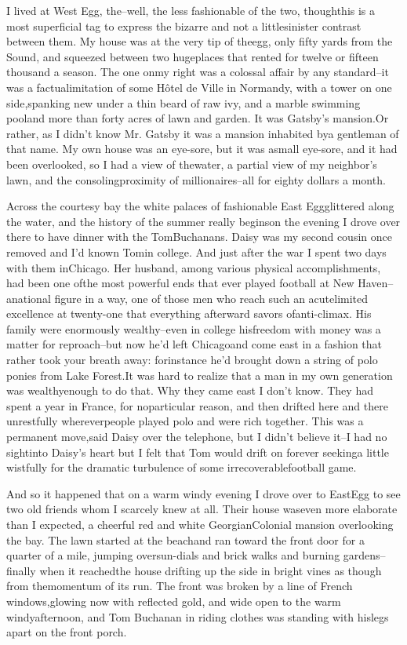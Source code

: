 \documentclass[12pt,a4paper]{report}
\begin{document}
I lived at West Egg, the--well, the less fashionable of the two, thoughthis is a most superficial tag to express the bizarre and not a littlesinister contrast between them. My house was at the very tip of theegg, only fifty yards from the Sound, and squeezed between two hugeplaces that rented for twelve or fifteen thousand a season. The one onmy right was a colossal affair by any standard--it was a factualimitation of some Hôtel de Ville in Normandy, with a tower on one side,spanking new under a thin beard of raw ivy, and a marble swimming pooland more than forty acres of lawn and garden. It was Gatsby's mansion.Or rather, as I didn't know Mr. Gatsby it was a mansion inhabited bya gentleman of that name. My own house was an eye-sore, but it was asmall eye-sore, and it had been overlooked, so I had a view of thewater, a partial view of my neighbor's lawn, and the consolingproximity of millionaires--all for eighty dollars a month.

Across the courtesy bay the white palaces of fashionable East Eggglittered along the water, and the history of the summer really beginson the evening I drove over there to have dinner with the TomBuchanans. Daisy was my second cousin once removed and I'd known Tomin college. And just after the war I spent two days with them inChicago.
Her husband, among various physical accomplishments, had been one ofthe most powerful ends that ever played football at New Haven--anational figure in a way, one of those men who reach such an acutelimited excellence at twenty-one that everything afterward savors ofanti-climax. His family were enormously wealthy--even in college hisfreedom with money was a matter for reproach--but now he'd left Chicagoand come east in a fashion that rather took your breath away: forinstance he'd brought down a string of polo ponies from Lake Forest.It was hard to realize that a man in my own generation was wealthyenough to do that.
Why they came east I don't know. They had spent a year in France, for noparticular reason, and then drifted here and there unrestfully whereverpeople played polo and were rich together. This was a permanent move,said Daisy over the telephone, but I didn't believe it--I had no sightinto Daisy's heart but I felt that Tom would drift on forever seekinga little wistfully for the dramatic turbulence of some irrecoverablefootball game.

And so it happened that on a warm windy evening I drove over to EastEgg to see two old friends whom I scarcely knew at all. Their house waseven more elaborate than I expected, a cheerful red and white GeorgianColonial mansion overlooking the bay. The lawn started at the beachand ran toward the front door for a quarter of a mile, jumping oversun-dials and brick walks and burning gardens--finally when it reachedthe house drifting up the side in bright vines as though from themomentum of its run. The front was broken by a line of French windows,glowing now with reflected gold, and wide open to the warm windyafternoon, and Tom Buchanan in riding clothes was standing with hislegs apart on the front porch.
\end{document}
